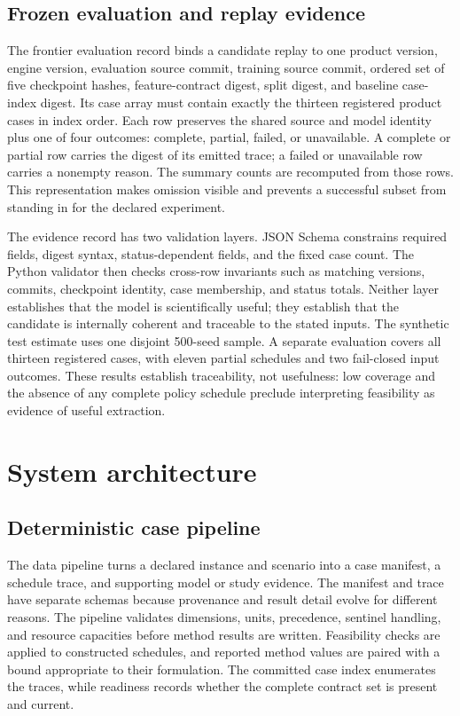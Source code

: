 \subsection{Frozen evaluation and replay evidence}
\label{sec:data-frontier-release}
The frontier evaluation record binds a candidate replay to one product version, engine version, evaluation source commit, training source commit, ordered set of five checkpoint hashes, feature-contract digest, split digest, and baseline case-index digest. Its case array must contain exactly the thirteen registered product cases in index order. Each row preserves the shared source and model identity plus one of four outcomes: complete, partial, failed, or unavailable. A complete or partial row carries the digest of its emitted trace; a failed or unavailable row carries a nonempty reason. The summary counts are recomputed from those rows. This representation makes omission visible and prevents a successful subset from standing in for the declared experiment.

The evidence record has two validation layers. JSON Schema constrains required fields, digest syntax, status-dependent fields, and the fixed case count. The Python validator then checks cross-row invariants such as matching versions, commits, checkpoint identity, case membership, and status totals. Neither layer establishes that the model is scientifically useful; they establish that the candidate is internally coherent and traceable to the stated inputs. The synthetic test estimate uses one disjoint 500-seed sample. A separate evaluation covers all thirteen registered cases, with eleven partial schedules and two fail-closed input outcomes. These results establish traceability, not usefulness: low coverage and the absence of any complete policy schedule preclude interpreting feasibility as evidence of useful extraction.



\section{System architecture}
\label{sec:software-architecture}
\subsection{Deterministic case pipeline}
The data pipeline turns a declared instance and scenario into a case manifest, a schedule trace, and supporting model or study evidence. The manifest and trace have separate schemas because provenance and result detail evolve for different reasons. The pipeline validates dimensions, units, precedence, sentinel handling, and resource capacities before method results are written. Feasibility checks are applied to constructed schedules, and reported method values are paired with a bound appropriate to their formulation. The committed case index enumerates the traces, while readiness records whether the complete contract set is present and current.

